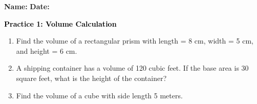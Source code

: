 \documentclass[12pt, letterpaper, fleqn]{article}
\begin{document}
\textbf{Name:} \underline{\hspace{5cm}}
\hfill
\textbf{Date:} \underline{\hspace{3cm}}\\

\begin{tcolorbox}[colback=customteal!20]
    \large\textcolor{black}{\textbf{Practice 1: Volume Calculation}}
\end{tcolorbox}
\begin{enumerate}[itemsep=3.5cm, leftmargin=0.6cm]
\item Find the volume of a rectangular prism with length = 8 cm, width = 5 cm, and height = 6 cm.
\vspace{3.5cm}
\item A shipping container has a volume of 120 cubic feet. If the base area is 30 square feet, what is the height of the container?
\vspace{3.5cm}
\item Find the volume of a cube with side length 5 meters.
\end{enumerate}
\end{document}
